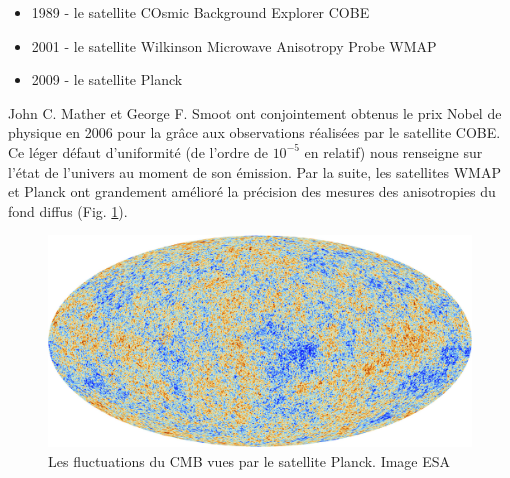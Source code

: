 \begin{itemize}
\item 1989 - le satellite COsmic Background Explorer COBE 
\item 2001 - le satellite Wilkinson Microwave Anisotropy Probe WMAP
\item 2009 - le satellite Planck
\end{itemize}

%
%

John C. Mather et George F. Smoot ont conjointement obtenus le prix Nobel de physique en 2006 pour la \cite{CMBanisotropiesNobel} grâce aux observations réalisées par le satellite  COBE.
Ce léger défaut d'uniformité (de l'ordre de $10^{-5}$ en relatif) nous renseigne sur l’état de l'univers au moment de son émission.
Par la suite, les satellites WMAP et Planck ont grandement amélioré la précision des mesures des anisotropies du fond diffus (Fig. \ref{fig:cmb}).

\begin{figure}
        \includegraphics[width=0.95 \textwidth]{img/01/CMB.jpeg} 

        \caption[CMB]{Les fluctuations du \ac{CMB} vues par le satellite Planck. 
        Image ESA}
 		\label{fig:cmb}
\end{figure}

